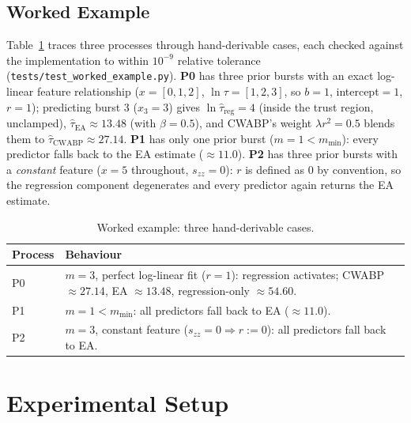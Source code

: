 \documentclass[10pt,twocolumn]{article}
\begin{document}
\subsection{Worked Example}
Table~\ref{tab:worked} traces three processes through hand-derivable cases, each checked against the implementation to within $10^{-9}$ relative tolerance (\texttt{tests/test\_worked\_example.py}). \textbf{P0} has three prior bursts with an exact log-linear feature relationship ($x{=}[0,1,2]$, $\ln\tau{=}[1,2,3]$, so $b{=}1$, intercept${=}1$, $r{=}1$); predicting burst 3 ($x_3{=}3$) gives $\ln\hat\tau_{\mathrm{reg}}{=}4$ (inside the trust region, unclamped), $\hat\tau_{\mathrm{EA}}{\approx}13.48$ (with $\beta{=}0.5$), and CWABP's weight $\lambda r^2{=}0.5$ blends them to $\hat\tau_{\mathrm{CWABP}}{\approx}27.14$. \textbf{P1} has only one prior burst ($m{=}1<m_{\min}$): every predictor falls back to the EA estimate ($\approx11.0$). \textbf{P2} has three prior bursts with a \emph{constant} feature ($x{=}5$ throughout, $s_{zz}{=}0$): $r$ is defined as $0$ by convention, so the regression component degenerates and every predictor again returns the EA estimate.

\begin{table}[h]
\centering
\caption{Worked example: three hand-derivable cases.}
\label{tab:worked}
\scriptsize
\begin{tabular}{lp{5.7cm}}
\toprule
\textbf{Process} & \textbf{Behaviour} \\
\midrule
P0 & $m{=}3$, perfect log-linear fit ($r{=}1$): regression activates; CWABP $\approx27.14$, EA $\approx13.48$, regression-only $\approx54.60$. \\
P1 & $m{=}1<m_{\min}$: all predictors fall back to EA ($\approx11.0$). \\
P2 & $m{=}3$, constant feature ($s_{zz}{=}0\Rightarrow r{:=}0$): all predictors fall back to EA. \\
\bottomrule
\end{tabular}
\end{table}

\section{Experimental Setup}
\end{document}
